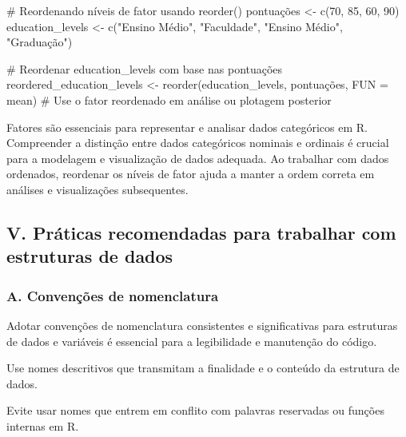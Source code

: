 \documentclass[
  letterpaper,
  DIV=11,
  numbers=noendperiod]{scrartcl}
\newenvironment{Shaded}{\begin{snugshade}}{\end{snugshade}}
\newcommand{\AttributeTok}[1]{\textcolor[rgb]{0.40,0.45,0.13}{#1}}
\newcommand{\CommentTok}[1]{\textcolor[rgb]{0.37,0.37,0.37}{#1}}
\newcommand{\DecValTok}[1]{\textcolor[rgb]{0.68,0.00,0.00}{#1}}
\newcommand{\FunctionTok}[1]{\textcolor[rgb]{0.28,0.35,0.67}{#1}}
\newcommand{\NormalTok}[1]{\textcolor[rgb]{0.00,0.23,0.31}{#1}}
\newcommand{\OtherTok}[1]{\textcolor[rgb]{0.00,0.23,0.31}{#1}}
\newcommand{\StringTok}[1]{\textcolor[rgb]{0.13,0.47,0.30}{#1}}
\begin{document}
\begin{Shaded}
\begin{Highlighting}[]
\CommentTok{\# Reordenando níveis de fator usando reorder()}
\NormalTok{pontuações }\OtherTok{\textless{}{-}} \FunctionTok{c}\NormalTok{(}\DecValTok{70}\NormalTok{, }\DecValTok{85}\NormalTok{, }\DecValTok{60}\NormalTok{, }\DecValTok{90}\NormalTok{)}
\NormalTok{education\_levels }\OtherTok{\textless{}{-}} \FunctionTok{c}\NormalTok{(}\StringTok{"Ensino Médio"}\NormalTok{, }\StringTok{"Faculdade"}\NormalTok{, }\StringTok{"Ensino Médio"}\NormalTok{, }\StringTok{"Graduação"}\NormalTok{)}

\CommentTok{\# Reordenar education\_levels com base nas pontuações}
\NormalTok{reordered\_education\_levels }\OtherTok{\textless{}{-}} \FunctionTok{reorder}\NormalTok{(education\_levels, pontuações, }\AttributeTok{FUN =}\NormalTok{ mean)}
\CommentTok{\# Use o fator reordenado em análise ou plotagem posterior}
\end{Highlighting}
\end{Shaded}

Fatores são essenciais para representar e analisar dados categóricos em
R. Compreender a distinção entre dados categóricos nominais e ordinais é
crucial para a modelagem e visualização de dados adequada. Ao trabalhar
com dados ordenados, reordenar os níveis de fator ajuda a manter a ordem
correta em análises e visualizações subsequentes.

\hypertarget{v.-pruxe1ticas-recomendadas-para-trabalhar-com-estruturas-de-dados}{%
\subsection{V. Práticas recomendadas para trabalhar com estruturas de
dados}\label{v.-pruxe1ticas-recomendadas-para-trabalhar-com-estruturas-de-dados}}

\hypertarget{a.-convenuxe7uxf5es-de-nomenclatura}{%
\subsubsection{A. Convenções de
nomenclatura}\label{a.-convenuxe7uxf5es-de-nomenclatura}}

Adotar convenções de nomenclatura consistentes e significativas para
estruturas de dados e variáveis é essencial para a legibilidade e
manutenção do código.

Use nomes descritivos que transmitam a finalidade e o conteúdo da
estrutura de dados.

Evite usar nomes que entrem em conflito com palavras reservadas ou
funções internas em R.
\end{document}
